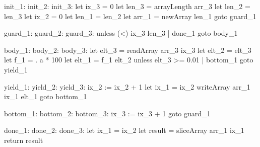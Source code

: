 \documentclass[preamble.tex]{subfiles}
\begin{document}

\begin{hscode2}[%
    literate=
        {_1}{{\sub{filt}}}2 %
        {_2}{{\sub{map}}}3 %
        {_3}{{\sub{mfst}}}3 %
]
init_1:
init_2:
init_3:
  let ix_3 = 0
  let len_3 = arrayLength arr_3
  let len_2 = len_3
  let ix_2 = 0
  let len_1 = len_2
  let arr_1 = newArray len_1
  goto guard_1

guard_1:
guard_2:
guard_3:
  unless (<) ix_3 len_3 | done_1
  goto body_1

body_1:
body_2:
body_3:
  let elt_3 = readArray arr_3 ix_3
  let elt_2 = elt_3
  let f_1 = \a. a * 100
  let elt_1 = f_1 elt_2
  unless elt_3 >= 0.01 | bottom_1
  goto yield_1

yield_1:
yield_2:
yield_3:
  ix_2 := ix_2 + 1
  let ix_1 = ix_2
  writeArray arr_1 ix_1 elt_1
  goto bottom_1

bottom_1:
bottom_2:
bottom_3:
  ix_3 := ix_3 + 1
  goto guard_1

done_1:
done_2:
done_3:
  let ix_1 = ix_2
  let result = sliceArray arr_1 ix_1
  return result
\end{hscode2}
\end{document}

